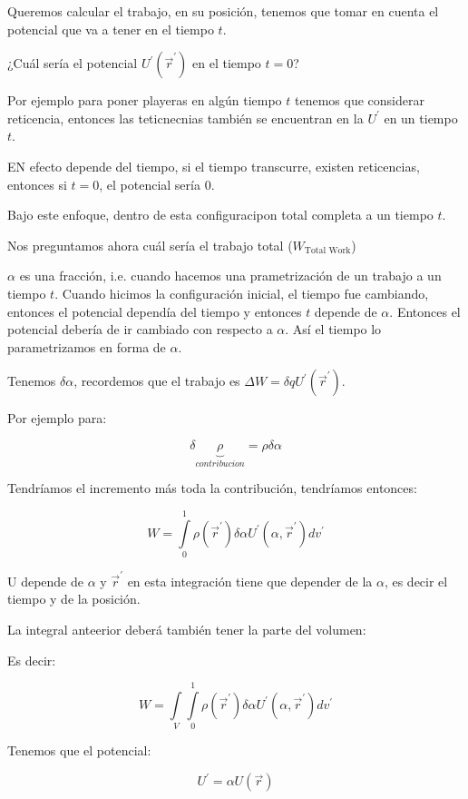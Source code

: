 \documentclass{article}
\begin{document}
	
	
Queremos calcular el trabajo, en su posición, tenemos que tomar en cuenta el potencial que va a tener en el tiempo $t$.

¿Cuál sería el potencial $U^{\prime}(\vec{r}^{\prime})$ en el tiempo $t=0$?

Por ejemplo para poner playeras en algún tiempo $t$ tenemos que considerar reticencia, entonces las teticnecnias también se encuentran en la $U^{\prime}$ en un tiempo $t$.


EN efecto depende del tiempo, si el tiempo transcurre, existen reticencias, entonces si $t=0$, el potencial sería $0$.


Bajo este enfoque, dentro de esta configuracipon total completa a un tiempo $t$.

Nos preguntamos ahora cuál sería el trabajo total ($W_{\text{Total Work}}$)

$\alpha$ es una fracción, i.e. cuando hacemos una prametrización de un trabajo a un tiempo $t$. Cuando hicimos la configuración inicial, el tiempo fue cambiando, entonces el potencial dependía del tiempo y entonces $t$ depende de $\alpha$. Entonces el potencial debería de ir cambiado con respecto a $\alpha$. Así el tiempo lo parametrizamos en forma de $\alpha$. 

Tenemos $\delta{\alpha}$, recordemos que el trabajo es $\Delta{W} = \delta{q}U^{\prime}(\vec{r}^{\prime})$. 


Por ejemplo para:


\[\delta \underbrace{{\rho}}_{contribucion} = \rho \delta{\alpha}  \]

Tendríamos el incremento más toda la contribución, tendríamos entonces:



\[ W = \int\limits_{0}^{1} \rho(\vec{r}^{\prime})\delta{\alpha} U^{\prime}(\alpha,\vec{r}^{\prime}) dv^{\prime} \]


U depende de $\alpha$ y $\vec{r}^{\prime}$ en esta integración tiene que depender de la $\alpha$, es decir el tiempo y de la posición. 

La integral anteerior deberá también tener la parte del volumen:


Es decir: 


\[ W = \int\limits_{V}  \int\limits_{0}^{1} \rho(\vec{r}^{\prime})\delta{\alpha} U^{\prime}(\alpha,\vec{r}^{\prime}) dv^{\prime} \]


Tenemos que el potencial:


\[ U^{\prime} = \alpha U(\vec{r})  \]
\end{document}
